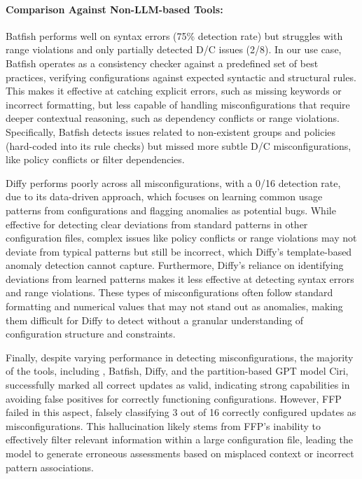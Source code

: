 \paragraph{Comparison Against Non-LLM-based Tools:} Batfish performs well on
syntax errors (75\% detection rate) but struggles with range violations and
only partially detected D/C issues (2/8). In our use case, Batfish operates as a consistency checker against a predefined set of best practices, verifying configurations against expected syntactic and structural rules. 
This makes it effective at catching explicit errors, such as missing keywords or incorrect formatting, but less capable of handling misconfigurations that require deeper contextual reasoning, such as dependency conflicts or range violations. Specifically, Batfish 
detects issues related to non-existent groups and policies (hard-coded into its
rule checks) but missed more subtle D/C misconfigurations, like policy
conflicts or filter dependencies.

Diffy performs poorly across all misconfigurations, with a 0/16 detection rate, due to its data-driven approach, which focuses on learning common usage patterns from configurations and flagging anomalies as potential bugs. While effective for detecting clear deviations from standard patterns in other configuration files,
complex issues like policy conflicts or range violations may not deviate from typical patterns but still be incorrect, which Diffy’s template-based anomaly detection cannot capture. Furthermore, Diffy's reliance on identifying deviations from learned patterns makes it less effective at detecting syntax errors and range violations. These types of misconfigurations often follow standard formatting and numerical values that may not stand out as anomalies, making them difficult for Diffy to detect without a granular understanding of configuration structure and constraints.

Finally, despite varying performance in detecting misconfigurations, the majority of the tools, including \sysname{}, Batfish, Diffy, and the partition-based GPT model Ciri, successfully marked all correct updates as valid, indicating strong capabilities in avoiding false positives for correctly functioning configurations. 
However, FFP failed in this aspect, falsely classifying 3 out of 16 correctly configured updates as misconfigurations. This hallucination likely stems from FFP’s inability to effectively filter relevant information within a large configuration file, leading the model to generate erroneous assessments based on misplaced context or incorrect pattern associations. 

